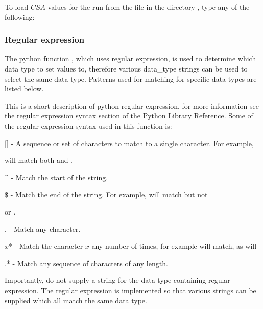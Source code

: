 To load $CSA$ values for the run 
 from the file 
 in the directory 
, type
any of the following:








\subsubsection{Regular expression}

The python function 
, which uses regular expression, is used to determine which data
type to set values to, therefore various data\_type strings can be used to select the same
data type.  Patterns used for matching for specific data types are listed below.

This is a short description of python regular expression, for more information see the
regular expression syntax section of the Python Library Reference.  Some of the regular
expression syntax used in this function is:

    [] - A sequence or set of characters to match to a single character.  For example,
    
 will match both 
 and 
.

    \^{} - Match the start of the string.

    \$ - Match the end of the string.  For example, 
 will match 
 but not 

    or 
.

    . - Match any character.

    $x$* - Match the character $x$ any number of times, for example 
 will match, as will
    


    .* - Match any sequence of characters of any length.

Importantly, do not supply a string for the data type containing regular expression.  The
regular expression is implemented so that various strings can be supplied which all match
the same data type.



